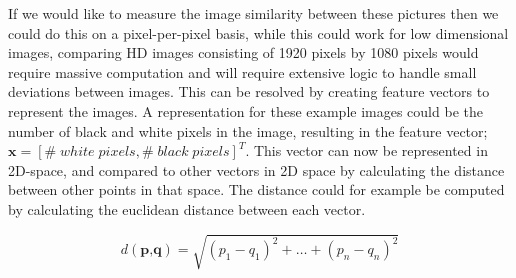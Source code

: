 \documentclass{article}
\begin{document}
If we would like to measure the image similarity between these pictures then we could do this on a pixel-per-pixel basis, while this could work for low dimensional images, comparing HD images consisting of 1920 pixels by 1080 pixels would require massive computation and will require extensive logic to handle small deviations between images. This can be resolved by creating feature vectors to represent the images. A representation for these example images could be the number of black and white pixels in the image, resulting in the feature vector; $\textbf{x} = [\#\;white\;pixels, \#\;black\;pixels]^T$. This vector can now be represented in 2D-space, and compared to other vectors in 2D space by calculating the distance between other points in that space. The distance could for example be computed by calculating the euclidean distance between each vector.

\[d(\textbf{p,q}) = \sqrt{(p_1 - q_1)^2 + \dots + (p_n - q_n)^2} \]
\end{document}

